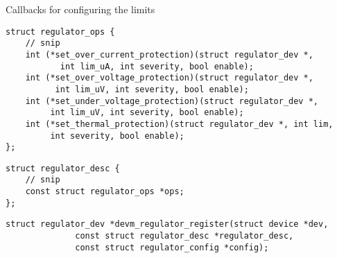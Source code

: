 \documentclass[10pt]{beamer}
\begin{document}

\begin{frame}[fragile]{Callbacks for configuring the limits}

\lstset{language=C}
\scriptsize

\begin{lstlisting}
struct regulator_ops {
	// snip
	int (*set_over_current_protection)(struct regulator_dev *,
	       int lim_uA, int severity, bool enable);
	int (*set_over_voltage_protection)(struct regulator_dev *,
	      int lim_uV, int severity, bool enable);
	int (*set_under_voltage_protection)(struct regulator_dev *,
	     int lim_uV, int severity, bool enable);
	int (*set_thermal_protection)(struct regulator_dev *, int lim,
	     int severity, bool enable);
};
\end{lstlisting}
\pause

\begin{lstlisting}
struct regulator_desc {
	// snip
	const struct regulator_ops *ops;
};
 \end{lstlisting}
\pause

\begin{lstlisting}
struct regulator_dev *devm_regulator_register(struct device *dev,
			  const struct regulator_desc *regulator_desc,
			  const struct regulator_config *config);
\end{lstlisting}

\end{frame}

\end{document}
